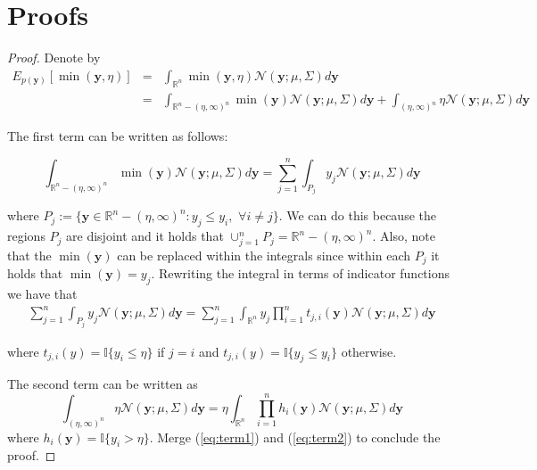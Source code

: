 \documentclass{article} %
\newcommand{\by}{\textbf{y}}
\newcommand{\N}{\mathcal{N}}
\newcommand{\IR}{\mathbb{R}}
\newtheorem{proof}{Proof}
\begin{document}
\section{Proofs}

\begin{proof}
Denote by 
\begin{eqnarray}\nonumber
E_{p(\by)} [\min (\by,\eta)] & = & \int_{\IR^n} \min (\by,\eta)  \N(\by; \mu, \Sigma) d\by\\ \nonumber
& = & \int_{\IR^n - (\eta,\infty)^n } \min (\by)  \N(\by; \mu, \Sigma) d\by + \int_{(\eta,\infty)^n} \eta  \N(\by; \mu, \Sigma) d\by  \nonumber
\end{eqnarray}

The first term can be written as follows:

\begin{equation}
 \int_{\IR^n - (\eta,\infty)^n } \min (\by)  \N(\by; \mu, \Sigma) d\by  =    \sum_{j=1}^n \int_{P_j} y_j \N(\by; \mu, \Sigma) d \by \nonumber
\end{equation}\nonumber

where $P_j := \{ \by \in\IR^n - (\eta,\infty)^n  : y_j \leq y_i,\,\, \forall i \neq j \}$. We can do this because the regions $P_j$ are disjoint and it holds that $\cup_{j=1}^{n}P_j = \IR^n - (\eta,\infty)^n $.  Also, note that the $\min(\by)$ can be replaced within the integrals since within each $P_j$ it holds that $\min(\by) = y_j$. Rewriting the integral in terms of indicator functions we have that
\begin{eqnarray}\label{eq:term1}
 \sum_{j=1}^n \int_{P_j} y_j \N(\by; \mu, \Sigma) d \by   =  \sum_{j=1}^n  \int_{\IR^n} y_j \prod_{i=1}^n t_{j,i}(\by) \N(\by; \mu, \Sigma) d \by 
\end{eqnarray}

where $t_{j,i}(y) =\mathbb{I}\{y_i \leq\eta\}$ if $j=i$ and $t_{j,i}(y) =\mathbb{I}\{y_j \leq y_i \}$ otherwise.

The second term can be written as
\begin{equation}\label{eq:term2}
 \int_{(\eta,\infty)^n } \eta  \N(\by; \mu, \Sigma) d\by = \eta\int_{\IR^n} \prod_{i=1}^nh_i(\by) \N(\by; \mu, \Sigma) d\by
\end{equation}
where $h_i(\by) = \mathbb{I}\{y_i>\eta\}$.  Merge (\ref{eq:term1}) and (\ref{eq:term2}) to conclude the proof.
 
\end{proof}
\end{document}
